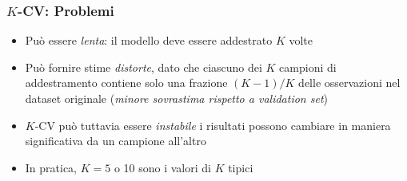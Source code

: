 \begin{frame}
	\frametitle{$K$-CV: Problemi}
	\begin{itemize}
		\item Può essere \emph{lenta}: il modello deve essere addestrato $K$ volte
		\item Può fornire stime \emph{distorte}, dato che ciascuno dei $K$ campioni di addestramento contiene solo una frazione $(K - 1)/K$ delle osservazioni nel dataset originale (\emph{minore sovrastima rispetto a validation set})
		\item $K$-CV può tuttavia essere \emph{instabile} i risultati possono cambiare in maniera significativa da un campione all'altro%
		\item In pratica, $K = 5$ o 10 sono i valori di $K$ tipici
	\end{itemize}
\end{frame}





